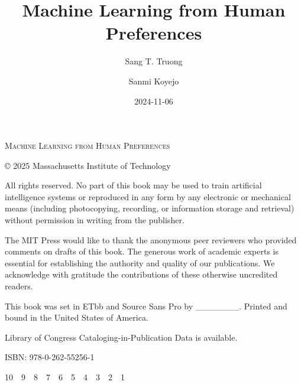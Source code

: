 \documentclass[
  letterpaper,
  numbers=noenddot,
  DIV=11]{scrreprt}
\title{Machine Learning from Human Preferences}
\author{Sang T. Truong \and Sanmi Koyejo}
\date{2024-11-06}
\theoremstyle{definition}
\theoremstyle{plain}
\theoremstyle{plain}
\theoremstyle{remark}
\begin{document}
\newgeometry{}

\begin{titlepage}
\end{titlepage}

\begin{titlepage}
  \centering
  {\scshape\Huge Machine Learning from Human
Preferences\par}\clearpage
\end{titlepage}


\begin{titlepage}
  \vspace*{\fill}
  {\rmfamily\scriptsize
    © 2025 Massachusetts Institute of Technology\par
    All rights reserved. No part of this book may be used to train artificial intelligence systems or reproduced in any form by any electronic or mechanical means (including photocopying, recording, or information storage and retrieval) without permission in writing from the publisher.\par
    The MIT Press would like to thank the anonymous peer reviewers who provided comments on drafts of this book. The generous work of academic experts is essential for establishing the authority and quality of our publications. We acknowledge with gratitude the contributions of these otherwise uncredited readers.\par
    This book was set in ETbb and Source Sans Pro by \_\_\_\_\_\_\_. Printed and bound in the United States of America.\par
    Library of Congress Cataloging-in-Publication Data is available.\par
    ISBN: 978-0-262-55256-1\par
    10 9 8 7 6 5 4 3 2 1\par
  }
  \vspace*{\fill}
\end{titlepage}
\end{document}
